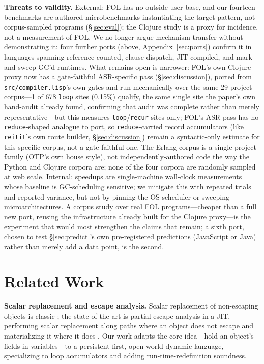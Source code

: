 \documentclass[sigplan,screen,review,anonymous]{acmart}
\begin{document}
\textbf{Threats to validity.} External: FOL has no outside user base, and
our fourteen benchmarks are authored microbenchmarks instantiating the
target pattern, not corpus-sampled programs (\S\ref{sec:eval});
the Clojure study is a proxy for incidence, not a measurement of FOL.
We no longer argue mechanism transfer without demonstrating it: four
further ports (above, Appendix~\ref{sec:ports}) confirm it in languages
spanning reference-counted, clause-dispatch, JIT-compiled, and
mark-and-sweep-GC'd runtimes.
What remains open is narrower: FOL's own Clojure proxy now has a
gate-faithful ASR-specific pass (\S\ref{sec:discussion}), ported from
\texttt{src/compiler.lisp}'s own gates and run mechanically over the same
29-project corpus---1 of 678 \texttt{loop} sites (0.15\%) qualify, the
same single site the paper's own hand-audit already found, confirming
that audit was complete rather than merely representative---but this
measures \texttt{loop}/\texttt{recur} sites only; FOL's ASR pass has no
\texttt{reduce}-shaped analogue to port, so \texttt{reduce}-carried record
accumulators (like \texttt{reitit}'s own route builder, \S\ref{sec:discussion})
remain a syntactic-only estimate for this specific corpus, not a
gate-faithful one. The Erlang corpus is a single project family (OTP's
own house style), not independently-authored code the way the Python
and Clojure corpora are; none of the four corpora are randomly sampled
at web scale. Internal: speedups are single-machine wall-clock
measurements whose baseline is GC-scheduling sensitive; we mitigate this
with repeated trials and reported variance, but not by pinning the OS
scheduler or sweeping microarchitectures. A corpus study over real FOL
programs---cheaper than a full new port, reusing the infrastructure
already built for the Clojure proxy---is the experiment that would most
strengthen the claims that remain; a sixth port, chosen to test
\S\ref{sec:predict}'s own pre-registered predictions (JavaScript or Java)
rather than merely add a data point, is the second.

\section{Related Work}
\label{sec:related}

\textbf{Scalar replacement and escape analysis.} Scalar replacement of
non-escaping objects is classic \cite{choi1999escape,blanchet2003escape}; the
state of the art is partial escape analysis in a JIT, performing scalar
replacement along paths where an object does not escape and materializing it
where it does \cite{stadler2014partial}. Our work adapts the core
idea---hold an object's fields in variables---to a persistent-first,
open-world dynamic language, specializing to loop accumulators and adding
run-time-redefinition soundness.
\end{document}
